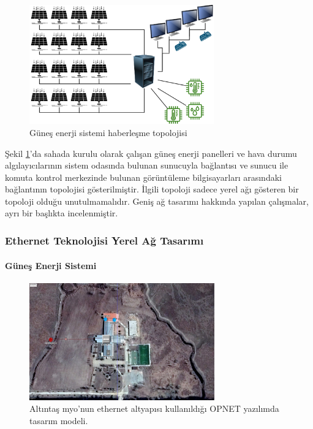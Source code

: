 \begin{figure}[htbp]
\centerline{\includegraphics[width=8cm]{Resim/Sekil4-6.png}}
\caption{Güneş enerji sistemi haberleşme topolojisi}
\label{fig:4-6}
\end{figure}

Şekil \ref{fig:4-6}’da sahada kurulu olarak çalışan güneş enerji panelleri ve hava durumu algılayıcılarının sistem odasında bulunan sunucuyla bağlantısı ve sunucu ile komuta kontrol merkezinde bulunan görüntüleme bilgisayarları arasındaki bağlantının topolojisi gösterilmiştir. İlgili topoloji sadece yerel ağı gösteren bir topoloji olduğu unutulmamalıdır. Geniş ağ tasarımı hakkında yapılan çalışmalar, ayrı bir başlıkta incelenmiştir.

\subsubsection{Ethernet Teknolojisi Yerel Ağ Tasarımı}\label{yerelEthernet}


\paragraph{Güneş Enerji Sistemi}

\begin{figure}[htbp]
\centerline{\includegraphics[width=8cm]{Resim/Sekil4-7.jpg}}
\caption{Altıntaş \gls{myo}'nun ethernet altyapısı kullanıldığı OPNET yazılımda tasarım modeli.}
\label{fig:4-7}
\end{figure}

